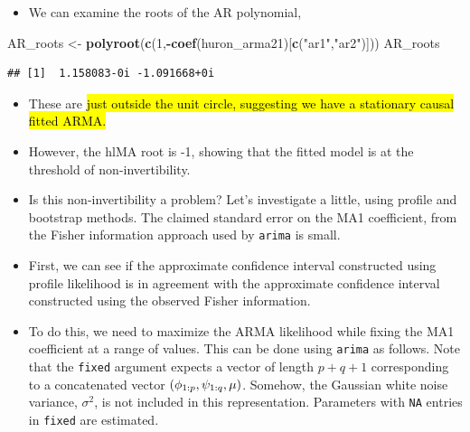 \documentclass[]{article}
\newenvironment{Shaded}{\begin{snugshade}}{\end{snugshade}}
\newcommand{\KeywordTok}[1]{\textcolor[rgb]{0.13,0.29,0.53}{\textbf{#1}}}
\newcommand{\DecValTok}[1]{\textcolor[rgb]{0.00,0.00,0.81}{#1}}
\newcommand{\StringTok}[1]{\textcolor[rgb]{0.31,0.60,0.02}{#1}}
\newcommand{\OperatorTok}[1]{\textcolor[rgb]{0.81,0.36,0.00}{\textbf{#1}}}
\newcommand{\NormalTok}[1]{#1}
\providecommand{\tightlist}{%
  \setlength{\itemsep}{0pt}\setlength{\parskip}{0pt}}
\begin{document}
\begin{itemize}
\tightlist
\item
  We can examine the roots of the AR polynomial,
\end{itemize}

\begin{Shaded}
\begin{Highlighting}[]
\NormalTok{AR_roots <-}\StringTok{ }\KeywordTok{polyroot}\NormalTok{(}\KeywordTok{c}\NormalTok{(}\DecValTok{1}\NormalTok{,}\OperatorTok{-}\KeywordTok{coef}\NormalTok{(huron_arma21)[}\KeywordTok{c}\NormalTok{(}\StringTok{"ar1"}\NormalTok{,}\StringTok{"ar2"}\NormalTok{)]))}
\NormalTok{AR_roots}
\end{Highlighting}
\end{Shaded}

\begin{verbatim}
## [1]  1.158083-0i -1.091668+0i
\end{verbatim}

\begin{itemize}
\item
  These are \hl{just outside the unit circle, suggesting we have a
  stationary causal fitted ARMA.}
\item
  However, the 
  hl{MA root is -1, showing that the fitted model is at the
  threshold of non-invertibility.}
\item
  Is this non-invertibility a problem? Let's investigate a little, using
  profile and bootstrap methods. The claimed standard error on the MA1
  coefficient, from the Fisher information approach used by
  \texttt{arima} is small.
\item
  First, we can see if the approximate confidence interval constructed
  using profile likelihood is in agreement with the approximate
  confidence interval constructed using the observed Fisher information.
\item
  To do this, we need to maximize the ARMA likelihood while fixing the
  MA1 coefficient at a range of values. This can be done using
  \texttt{arima} as follows. Note that the \texttt{fixed} argument
  expects a vector of length \(p+q+1\) corresponding to a concatenated
  vector \((\phi_{1:p},\psi_{1:q}, \mu)\). Somehow, the Gaussian white
  noise variance, \(\sigma^2\), is not included in this representation.
  Parameters with \texttt{NA} entries in \texttt{fixed} are estimated.
\end{itemize}
\end{document}
